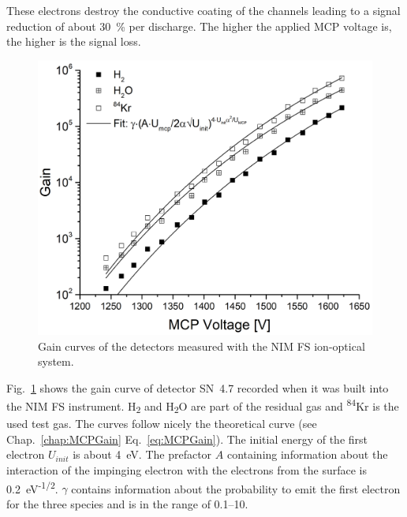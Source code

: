 	These electrons destroy the conductive coating of the channels leading to a signal reduction of about 30~\% per discharge. The higher the applied MCP voltage is, the higher is the signal loss.\\
	\begin{figure}[h!] %
		\centering
		\includegraphics[width=.7\textwidth]{Experiments/GainDetFSLabEl.png}
		\caption{Gain curves of the detectors measured with the NIM FS ion-optical system.}
		\label{fig:MCPGainCurve4p7}
	\end{figure}
	Fig.~\ref{fig:MCPGainCurve4p7} shows the gain curve of detector SN~4.7 recorded when it was built into the NIM FS instrument. H\textsubscript{2} and H\textsubscript{2}O are part of the residual gas and \textsuperscript{84}Kr is the used test gas. The curves follow nicely the theoretical curve (see Chap.~\ref{chap:MCPGain} Eq.~\eqref{eq:MCPGain}). The initial energy of the first electron $U_{init}$ is about 4~eV. The prefactor $A$ containing information about the interaction of the impinging electron with the electrons from the surface is 0.2~eV\textsuperscript{-1/2}. $\gamma$ contains information about the probability to emit the first electron for the three species and is in the range of 0.1--10.\\
